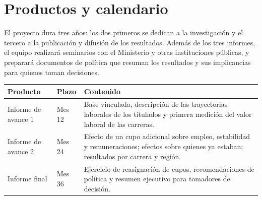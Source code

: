 \documentclass[11pt,a4paper]{article}
\begin{document}
\section{Productos y calendario}

El proyecto dura tres años: los dos primeros se dedican a la investigación y el tercero a la publicación y difusión de los resultados. Además de los tres informes, el equipo realizará seminarios con el Ministerio y otras instituciones públicas, y preparará documentos de política que resuman los resultados y sus implicancias para quienes toman decisiones.

\begin{center}
\small
\renewcommand{\arraystretch}{1.25}
\begin{tabularx}{\textwidth}{>{\raggedright\arraybackslash}p{3.1cm}>{\centering\arraybackslash}p{1.6cm}>{\raggedright\arraybackslash}X}
\toprule
\textbf{Producto} & \textbf{Plazo} & \textbf{Contenido} \\
\midrule
Informe de avance 1 & Mes 12 & Base vinculada, descripción de las trayectorias laborales de los titulados y primera medición del valor laboral de las carreras. \\
Informe de avance 2 & Mes 24 & Efecto de un cupo adicional sobre empleo, estabilidad y remuneraciones; efectos sobre quienes ya estaban; resultados por carrera y región. \\
Informe final & Mes 36 & Ejercicio de reasignación de cupos, recomendaciones de política y resumen ejecutivo para tomadores de decisión. \\
\bottomrule
\end{tabularx}
\end{center}
\end{document}
